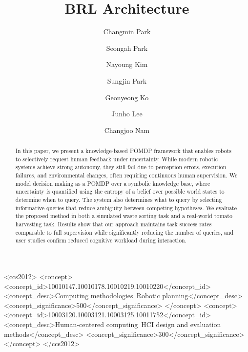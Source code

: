 \documentclass[manuscript,screen,review]{acmart}
\begin{document}
\title{BRL Architecture}

\author{Changmin Park}

\author{Seongah Park}

\author{Nayoung Kim}

\author{Sungjin Park}

\author{Geonyeong Ko}

\author{Junho Lee}

\author{Changjoo Nam}

\begin{abstract}
In this paper, we present a knowledge-based POMDP framework that enables robots to selectively request human feedback under uncertainty. While modern robotic systems achieve strong autonomy, they still fail due to perception errors, execution failures, and environmental changes, often requiring continuous human supervision. We model decision making as a POMDP over a symbolic knowledge base, where uncertainty is quantified using the entropy of a belief over possible world states to determine when to query. The system also determines what to query by selecting informative queries that reduce ambiguity between competing hypotheses. We evaluate the proposed method in both a simulated waste sorting task and a real-world tomato harvesting task. Results show that our approach maintains task success rates comparable to full supervision while significantly reducing the number of queries, and user studies confirm reduced cognitive workload during interaction.
\end{abstract}

\begin{CCSXML}
<ccs2012>
 <concept>
  <concept_id>10010147.10010178.10010219.10010220</concept_id>
  <concept_desc>Computing methodologies~Robotic planning</concept_desc>
  <concept_significance>500</concept_significance>
 </concept>
 <concept>
  <concept_id>10003120.10003121.10003125.10011752</concept_id>
  <concept_desc>Human-centered computing~HCI design and evaluation methods</concept_desc>
  <concept_significance>300</concept_significance>
 </concept>
</ccs2012>
\end{CCSXML}
\end{document}
